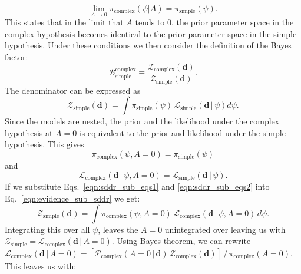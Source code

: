 \begin{equation}\label{eqn:sddr_condition}
    \lim_{A \to 0} \pi_{\mathrm{complex}} \left(\psi | A\right) = \pi_{\mathrm{simple}}\left(\psi\right).
\end{equation}
This states that in the limit that $A$ tends to $0$, the prior parameter space in the complex hypothesis becomes identical to the prior parameter space in the simple hypothesis. Under these conditions we then consider the definition of the Bayes factor:
\begin{equation}
    \mathcal{B}^{\mathrm{complex}}_{\mathrm{simple}} \equiv \frac{\mathcal{Z}_{\mathrm{complex}}(\mathbf{d})}{\mathcal{Z}_{\mathrm{simple}}(\mathbf{d})}.
\end{equation}
The denominator can be expressed as
\begin{equation}\label{eqn:evidence_sub_sddr}
    \mathcal{Z}_{\mathrm{simple}}(\mathbf{d}) = \int \pi_{\mathrm{simple}}\left(\psi\right) \, \mathcal{L}_{\mathrm{simple}} \left(\mathbf{d} \, | \, \psi \right)  d\psi.
\end{equation}
Since the models are nested, the prior and the likelihood under the complex hypothesis at $A=0$ is equivalent to the prior and likelihood under the simple hypothesis. This gives
\begin{equation}\label{eqn:sddr_sub_eqs1}
   \pi_{\mathrm{complex}}\left(\psi, A=0\right) = \pi_{\mathrm{simple}}\left(\psi \right)
\end{equation}
and
\begin{equation}\label{eqn:sddr_sub_eqs2}
    \mathcal{L}_{\mathrm{complex}}\left(\mathbf{d} \, | \, \psi, A=0\right) = \mathcal{L}_{\mathrm{simple}}\left( \mathbf{d} \, | \, \psi \right).
\end{equation}
If we substitute Eqs.~\ref{eqn:sddr_sub_eqs1} and \ref{eqn:sddr_sub_eqs2} into Eq.~\ref{eqn:evidence_sub_sddr} we get:
\begin{equation}
    \mathcal{Z}_{\mathrm{simple}}(\mathbf{d}) = \int \pi_{\mathrm{complex}}\left(\psi, A=0\right) \, \mathcal{L}_{\mathrm{complex}} \left(\mathbf{d} \, | \, \psi, A=0 \right)\,  d\psi.
\end{equation}
Integrating this over all $\psi$, leaves the $A=0$ unintegrated over leaving us with $\mathcal{Z}_{\mathrm{simple}} = \mathcal{L}_{\mathrm{complex}} \left(\mathbf{d} \, | \, A=0 \right)$. Using Bayes theorem, we can rewrite $\mathcal{L}_{\mathrm{complex}} \left(\mathbf{d} \, | \, A=0 \right) = [\mathcal{P}_{\mathrm{complex}}(A=0 \, | \, \mathbf{d}) \, \mathcal{Z}_{\mathrm{complex}}(\mathbf{d})] \, / \, \pi_{\mathrm{complex}} (A=0)$. This leaves us with:
